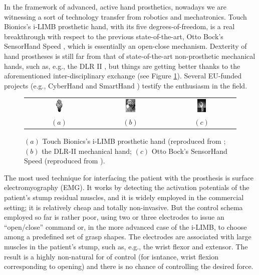 In the framework of advanced, active hand prosthetics, nowadays we are
witnessing a sort of technology transfer from robotics and
mechatronics. Touch Bionics's i-LIMB \cite{ilimb} prosthetic hand,
with its five degrees-of-freedom, is a real breakthrough with respect
to the previous state-of-the-art, Otto Bock's SensorHand Speed
\cite{sensorhand}, which is essentially an open-close
mechanism. Dexterity of hand prostheses is still far from that of
state-of-the-art non-prosthetic mechanical hands, such as, e.g., the
DLR II \cite{Hua2006}, but things are getting better thanks to the
aforementioned inter-disciplinary exchange (see Figure
\ref{fig:hands}). Several EU-funded projects (e.g., CyberHand
\cite{CyberHand} and SmartHand \cite{smarthand}) testify the
enthusiasm in the field.

\begin{figure}
  \begin{tabular}{ccc}
    \includegraphics[width=0.14\textwidth]{figs/hands_TB.jpg} &
    \includegraphics[width=0.14\textwidth]{figs/hands_DLRII.jpg} &
    \includegraphics[width=0.14\textwidth]{figs/hands_OB.jpg} \\
    $(a)$ & $(b)$ & $(c)$
  \end{tabular}
  \caption{$(a)$ Touch Bionics's i-LIMB prosthetic hand (reproduced
    from \cite{ilimb}; $(b)$ the DLR-II mechanical hand; $(c)$ Otto
    Bock's SensorHand Speed (reproduced from \cite{sensorhand}).}
  \label{fig:hands}
\end{figure}

The most used technique for interfacing the patient with the
prosthesis is surface electromyography (EMG). It works by detecting
the activation potentials of the patient's stump residual muscles, and
it is widely employed in the commercial setting; it is relatively
cheap and totally non-invasive. But the control schema employed so far
is rather poor, using two or three electrodes to issue an
``open/close'' command or, in the more advanced case of the i-LIMB, to
choose among a predefined set of grasp shapes. The electrodes are
associated with large muscles in the patient's stump, such as, e.g.,
the wrist flexor and extensor. The result is a highly non-natural for
of control (for isntance, wrist flexion corresponding to opening) and
there is no chance of controlling the desired force.

